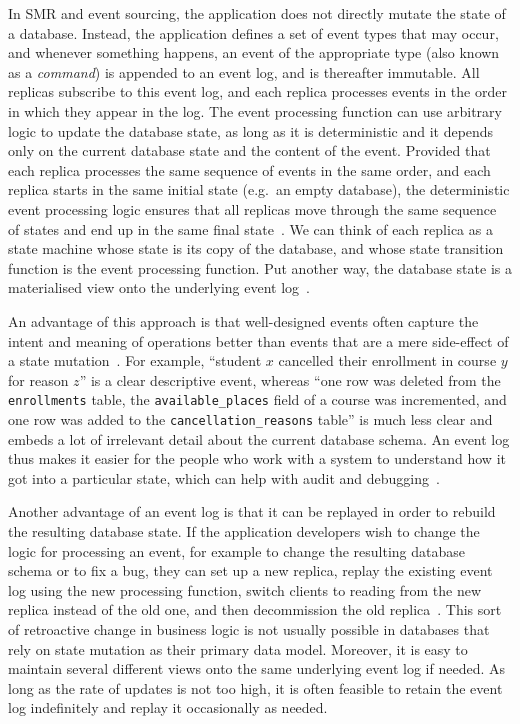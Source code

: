 \documentclass[sigconf]{acmart}
\begin{document}
In SMR and event sourcing, the application does not directly mutate the state of a database.
Instead, the application defines a set of event types that may occur, and whenever something happens, an event of the appropriate type (also known as a \emph{command}) is appended to an event log, and is thereafter immutable.
All replicas subscribe to this event log, and each replica processes events in the order in which they appear in the log.
The event processing function can use arbitrary logic to update the database state, as long as it is deterministic and it depends only on the current database state and the content of the event.
Provided that each replica processes the same sequence of events in the same order, and each replica starts in the same initial state (e.g.\ an empty database), the deterministic event processing logic ensures that all replicas move through the same sequence of states and end up in the same final state~\cite{Betts:2012,Schneider:1990}.
We can think of each replica as a state machine whose state is its copy of the database, and whose state transition function is the event processing function.
Put another way, the database state is a materialised view onto the underlying event log~\cite{Helland:2015}.

An advantage of this approach is that well-designed events often capture the intent and meaning of operations better than events that are a mere side-effect of a state mutation~\cite{Zimarev:2020}.
For example, ``student $x$ cancelled their enrollment in course $y$ for reason $z$'' is a clear descriptive event, whereas ``one row was deleted from the \verb+enrollments+ table, the \verb+available_places+ field of a course was incremented, and one row was added to the \verb+cancellation_reasons+ table'' is much less clear and embeds a lot of irrelevant detail about the current database schema.
An event log thus makes it easier for the people who work with a system to understand how it got into a particular state, which can help with audit and debugging~\cite{Betts:2012}.

Another advantage of an event log is that it can be replayed in order to rebuild the resulting database state.
If the application developers wish to change the logic for processing an event, for example to change the resulting database schema or to fix a bug, they can set up a new replica, replay the existing event log using the new processing function, switch clients to reading from the new replica instead of the old one, and then decommission the old replica~\cite{Kleppmann:2017}.
This sort of retroactive change in business logic is not usually possible in databases that rely on state mutation as their primary data model.
Moreover, it is easy to maintain several different views onto the same underlying event log if needed.
As long as the rate of updates is not too high, it is often feasible to retain the event log indefinitely and replay it occasionally as needed.
\end{document}

